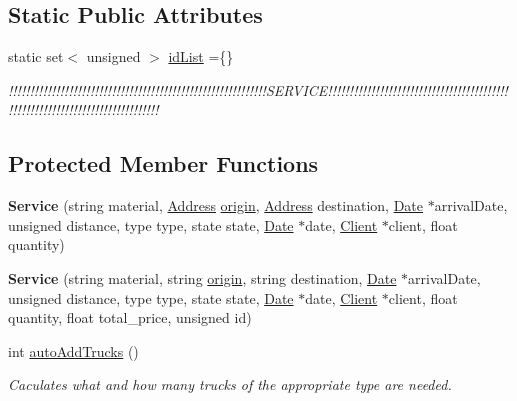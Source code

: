 \subsection*{Static Public Attributes}
\begin{DoxyCompactItemize}
\item 
\mbox{\label{class_service_aa7a534ea3d41185c16127e4f183520da}} 
static set$<$ unsigned $>$ \hyperlink{class_service_aa7a534ea3d41185c16127e4f183520da}{id\+List} =\{\}
\begin{DoxyCompactList}\small\item\em !!!!!!!!!!!!!!!!!!!!!!!!!!!!!!!!!!!!!!!!!!!!!!!!!!!!!!!!!!!!\+S\+E\+R\+V\+I\+C\+E!!!!!!!!!!!!!!!!!!!!!!!!!!!!!!!!!!!!!!!!!!!!!!!!!!!!!!!!!!!!!!!!!!!!!!!!!!!!! \end{DoxyCompactList}\end{DoxyCompactItemize}
\subsection*{Protected Member Functions}
\begin{DoxyCompactItemize}
\item 
\mbox{\label{class_service_ab00ec0b62c00dc5dfad8442c85de3b12}} 
{\bfseries Service} (string material, \hyperlink{class_address}{Address} \hyperlink{class_service_a4abd0a104d97e5bdb8e8ca93bab31ce7}{origin}, \hyperlink{class_address}{Address} destination, \hyperlink{class_date}{Date} $\ast$arrival\+Date, unsigned distance, type type, state state, \hyperlink{class_date}{Date} $\ast$date, \hyperlink{class_client}{Client} $\ast$client, float quantity)
\item 
\mbox{\label{class_service_aa8037c739c084ca5f12d25de6316d5ca}} 
{\bfseries Service} (string material, string \hyperlink{class_service_a4abd0a104d97e5bdb8e8ca93bab31ce7}{origin}, string destination, \hyperlink{class_date}{Date} $\ast$arrival\+Date, unsigned distance, type type, state state, \hyperlink{class_date}{Date} $\ast$date, \hyperlink{class_client}{Client} $\ast$client, float quantity, float total\+\_\+price, unsigned id)
\item 
int \hyperlink{class_service_a7df62bae781cf95c63af4eea324bceed}{auto\+Add\+Trucks} ()
\begin{DoxyCompactList}\small\item\em Caculates what and how many trucks of the appropriate type are needed. \end{DoxyCompactList}\end{DoxyCompactItemize}
